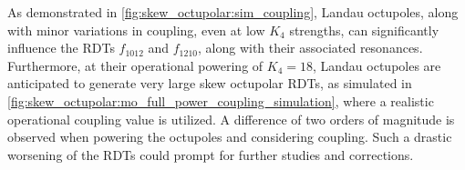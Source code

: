 

As demonstrated in \cref{fig:skew_octupolar:sim_coupling}, Landau octupoles, along with minor
variations in coupling, even at low $K_4$ strengths, can significantly influence the RDTs
$f_{1012}$ and $f_{1210}$, along with their associated resonances. Furthermore, at their
operational powering of $K_4=18$, Landau octupoles are anticipated to generate very large skew
octupolar RDTs, as simulated in \cref{fig:skew_octupolar:mo_full_power_coupling_simulation}, where a
realistic operational coupling value is utilized. A difference of two orders of magnitude is
observed when powering the octupoles and considering coupling.
Such a drastic worsening of the RDTs could prompt for further studies and corrections.

